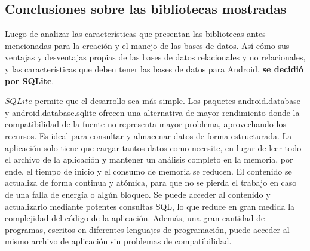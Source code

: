 \subsection{Conclusiones sobre las bibliotecas mostradas}\label{chapter:introduction}

Luego de analizar las características que presentan las bibliotecas antes mencionadas para la creación y el manejo de las bases de datos. Así cómo sus ventajas y desventajas propias de las bases de datos relacionales y no relacionales, y las características que deben tener las bases de datos para Android, \textbf{se decidió por SQLite}.

$SQLite$ permite que el desarrollo sea más simple. Los paquetes android.database y android.database.sqlite ofrecen una alternativa de mayor rendimiento donde la compatibilidad de la fuente no representa mayor problema, aprovechando los recursos. Es ideal para consultar y almacenar datos de forma estructurada. La aplicación solo tiene que cargar tantos datos como necesite, en lugar de leer todo el archivo de la aplicación y mantener un análisis completo en la memoria, por ende, el tiempo de inicio y el consumo de memoria se reducen. El contenido se actualiza de forma continua y atómica, para que no se pierda el trabajo en caso de una falla de energía o algún bloqueo. Se puede acceder al contenido y actualizarlo mediante potentes consultas SQL, lo que reduce en gran medida la complejidad del código de la aplicación. Además, una gran cantidad de programas, escritos en diferentes lenguajes de programación, puede acceder al mismo archivo de aplicación sin problemas de compatibilidad.

